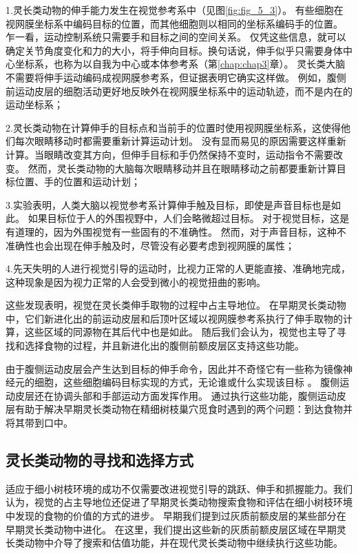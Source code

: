 1.灵长类动物的伸手能力发生在视觉参考系中（见图\ref{fig:fig_5_3}）。
有些细胞在视网膜坐标系中编码目标的位置，而其他细胞则以相同的坐标系编码手的位置。
乍一看，运动控制系统只需要手和目标之间的空间关系。
仅凭这些信息，就可以确定关节角度变化和力的大小，将手伸向目标。换句话说，伸手似乎只需要身体中心坐标系，也称为以自我为中心或本体参考系（第\ref{chap:chap3}章）。
灵长类大脑不需要将伸手运动编码成视网膜参考系，但证据表明它确实这样做。
例如，腹侧前运动皮层的细胞活动更好地反映外在视网膜坐标系中的运动轨迹，而不是内在的运动坐标系；\par


2.灵长类动物在计算伸手的目标点和当前手的位置时使用视网膜坐标系，这使得他们每次眼睛移动时都需要重新计算运动计划。
没有显而易见的原因需要这样重新计算。当眼睛改变其方向，但伸手目标和手仍然保持不变时，运动指令不需要改变。
然而，灵长类动物的大脑每次眼睛移动并且在眼睛移动之前都要重新计算目标位置、手的位置和运动计划；\par


3.实验表明，人类大脑以视觉参考系计算伸手触及目标，即使是声音目标也是如此。
如果目标位于人的外围视野中，人们会略微超过目标。
对于视觉目标，这是有道理的，因为外围视觉有一些固有的不准确性。
然而，对于声音目标，这种不准确性也会出现在伸手触及时，尽管没有必要考虑到视网膜的属性；\par


4.先天失明的人进行视觉引导的运动时，比视力正常的人更能直接、准确地完成，这种现象是因为视力正常的人会受到微小的视觉扭曲的影响。


这些发现表明，视觉在灵长类伸手取物的过程中占主导地位。
在早期灵长类动物中，它们新进化出的前运动皮层和后顶叶区域以视网膜参考系执行了伸手取物的计算，这些区域的同源物在其后代中也是如此。
随后我们会认为，视觉也主导了寻找和选择食物的过程，并且新进化出的腹侧前额皮层区支持这些功能。


由于腹侧运动皮层会产生达到目标的伸手命令，因此并不奇怪它有一些称为镜像神经元的细胞，这些细胞编码目标实现的方式，无论谁或什么实现该目标 \cite{umilta2001know}。
腹侧运动皮层还在协调头部和手部运动方面发挥作用。
通过执行这些功能，腹侧运动皮层有助于解决早期灵长类动物在精细树枝巢穴觅食时遇到的两个问题：到达食物并将其带到口中。



\subsection{灵长类动物的寻找和选择方式}

适应于细小树枝环境的成功不仅需要改进视觉引导的跳跃、伸手和抓握能力。我们认为，视觉的占主导地位还促进了早期灵长类动物搜索食物和评估在细小树枝环境中发现的食物的价值的方式的进步。
早期我们提到过灰质前额皮层的某些部分在早期灵长类动物中进化。
在这里，我们提出这些新的灰质前额皮层区域在早期灵长类动物中介导了搜索和估值功能，并在现代灵长类动物中继续执行这些功能。


